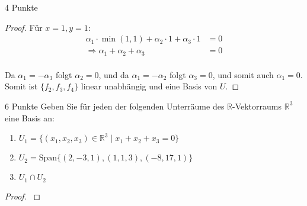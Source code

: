 \documentclass{problemset}
\begin{document}
\begin{problem}{4 Punkte}
\begin{proof}
    Für $x = 1, y = 1$:
    \begin{align*}
        \alpha_1 \cdot \min(1, 1) + \alpha_2 \cdot 1 + \alpha_3 \cdot 1 & = 0 \\
        \Rightarrow \alpha_1 + \alpha_2 + \alpha_3                      & = 0 \\
    \end{align*}

    Da $\alpha_1 = - \alpha_3$ folgt $\alpha_2 = 0$, und da $\alpha_1 = -
    \alpha_2$ folgt $\alpha_3 = 0$, und somit auch $\alpha_1 = 0$. Somit ist
    $\{f_2, f_3, f_4\}$ linear unabhängig und eine Basis von $U$.
\end{proof}
\end{problem}

\begin{problem}{6 Punkte}
Geben Sie für jeden der folgenden Unterräume des $\mathbb{R}$-Vektorraums $\mathbb{R}^3$ eine Basis an:
\begin{enumerate}
    \item $U_1 = \{(x_1, x_2, x_3) \in \mathbb{R}^3 \mid x_1 + x_2 + x_3 = 0\}$
    \item $U_2 = \text{Span}\{(2, -3, 1), (1, 1, 3), (-8, 17, 1)\}$
    \item $U_1 \cap U_2$
\end{enumerate}
\begin{proof}
    $ $


\end{proof}
\end{problem}
\end{document}
